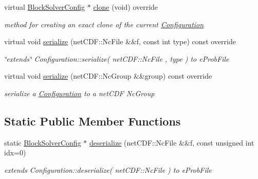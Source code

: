 \begin{DoxyCompactItemize}
virtual \mbox{\hyperlink{class_s_m_spp__di__unipi__it_1_1_block_solver_config}{Block\+Solver\+Config}} $\ast$ \mbox{\hyperlink{class_s_m_spp__di__unipi__it_1_1_block_solver_config_a41a9cf4b8ab0ae3454431ec9333a98d5}{clone}} (void) override
\begin{DoxyCompactList}\small\item\em method for creating an exact clone of the current \mbox{\hyperlink{class_s_m_spp__di__unipi__it_1_1_configuration}{Configuration}} \end{DoxyCompactList}\item 
virtual void \mbox{\hyperlink{class_s_m_spp__di__unipi__it_1_1_block_solver_config_a978c6b5919ce07663f3c325a99013bac}{serialize}} (net\+C\+D\+F\+::\+Nc\+File \&\&f, const int type) const override
\begin{DoxyCompactList}\small\item\em \char`\"{}extends\char`\"{} Configuration\+::serialize( net\+C\+D\+F\+::\+Nc\+File , type ) to e\+Prob\+File \end{DoxyCompactList}\item 
virtual void \mbox{\hyperlink{class_s_m_spp__di__unipi__it_1_1_block_solver_config_a8a626d908100f4419905d89f771150aa}{serialize}} (net\+C\+D\+F\+::\+Nc\+Group \&\&group) const override
\begin{DoxyCompactList}\small\item\em serialize a \mbox{\hyperlink{class_s_m_spp__di__unipi__it_1_1_configuration}{Configuration}} to a net\+C\+DF Nc\+Group \end{DoxyCompactList}\end{DoxyCompactItemize}
\subsection*{Static Public Member Functions}
\begin{DoxyCompactItemize}
\item 
static \mbox{\hyperlink{class_s_m_spp__di__unipi__it_1_1_block_solver_config}{Block\+Solver\+Config}} $\ast$ \mbox{\hyperlink{class_s_m_spp__di__unipi__it_1_1_block_solver_config_a77ea86dbac698a4e8416ed29849c582e}{deserialize}} (net\+C\+D\+F\+::\+Nc\+File \&\&f, const unsigned int idx=0)
\begin{DoxyCompactList}\small\item\em extends Configuration\+::deserialize( net\+C\+D\+F\+::\+Nc\+File ) to e\+Prob\+File \end{DoxyCompactList}\end{DoxyCompactItemize}
